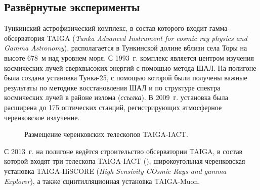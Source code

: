 \documentclass[magd,floatypics,numeref]{msudipl} %
\begin{document}
\subsection{Развёрнутые эксперименты}
Тункинский астрофизический комплекс, в состав которого входит гамма-обсерватория TAIGA (\textit{Tunka Advanced Instrument for cosmic ray physics and Gamma Astronomy}), располагается в Тункинской долине вблизи села Торы на высоте 678~м над уровнем моря. С 1993~г. комплекс является центром изучения космических лучей сверхвысоких энергий с помощью метода ШАЛ. На полигоне была создана установка Тунка-25, с помощью которой были получены важные результаты по методике восстановления ШАЛ и по структуре спектра космических лучей в районе излома (\textit{ссылка}). В 2009~г. установка была расширена до 175 оптических станций, регистрирующих атмосферное черенковское излучение.

 \begin{figure}[b]
	\noindent{}
	\caption{Размещение черенковских телескопов TAIGA-IACT.}
	\label{pic:IACTLocations}
\end{figure}

С 2013~г. на полигоне ведётся строительство обсерватории TAIGA, в состав которой входят три телескопа TAIGA-IACT (), широкоугольная черенковская установка TAIGA-HiSCORE (\textit{High Sensivity COsmic Rays and gamma Explorer}), а также сцинтилляционная установка TAIGA-Muon.
\end{document}
